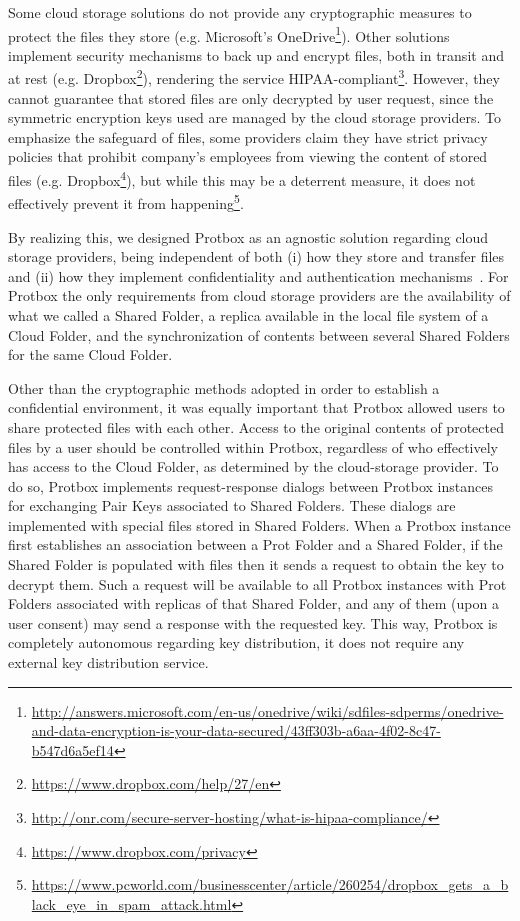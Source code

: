 \documentclass[english]{lni}
\newcommand\protbox{Protbox}
\newcommand\ProtF{Prot Folder}
\newcommand\ProtFs{Prot Folders}
\newcommand\SharedF{Shared Folder}
\newcommand\SharedFs{Shared Folders}
\newcommand\CloudF{Cloud Folder}
\newcommand\PairKeys{Pair Keys}
\begin{document}
Some cloud storage solutions do not provide any cryptographic
measures to protect the files they store (e.g. Microsoft's
OneDrive\footnote{\url{http://answers.microsoft.com/en-us/onedrive/wiki/sdfiles-sdperms/onedrive-and-data-encryption-is-your-data-secured/43ff303b-a6aa-4f02-8c47-b547d6a5ef14}}).
Other solutions implement security mechanisms to back up and encrypt
files, both in transit and at rest (e.g.
Dropbox\footnote{\url{https://www.dropbox.com/help/27/en}}), rendering the
service
HIPAA-compliant\footnote{\url{http://onr.com/secure-server-hosting/what-is-hipaa-compliance/}}.
However, they cannot guarantee that stored files are only decrypted
by user request, since the symmetric encryption keys used are
managed by the cloud storage providers.  To emphasize the safeguard
of files, some providers claim they have strict privacy policies
that prohibit company's employees from viewing the content of
stored files (e.g.
Dropbox\footnote{\url{https://www.dropbox.com/privacy}}), but while this
may be a deterrent measure, it does not effectively prevent it from
happening\footnote{\url{https://www.pcworld.com/businesscenter/article/260254/dropbox_gets_a_black_eye_in_spam_attack.html}}.

By realizing this, we designed {\protbox} as an agnostic solution
regarding cloud storage providers, being independent of both
(i) how they store and transfer files and (ii) how they implement
confidentiality and authentication mechanisms~\cite{cloudsecurity}. 
For {\protbox} the
only requirements from cloud storage providers are the availability
of what we called a {\SharedF}, a replica available in the local file
system of a {\CloudF}, and the synchronization of contents between
several {\SharedFs} for the same {\CloudF}.

Other than the cryptographic methods adopted in order to establish a
confidential environment, it was equally important that {\protbox}
allowed users to share protected files with each other. Access to the
original contents of protected files by a user should be controlled
within {\protbox}, regardless of who effectively has access to the
{\CloudF}, as determined by the cloud-storage provider. To do
so, {\protbox} implements request-response dialogs between
{\protbox} instances for exchanging {\PairKeys} associated to
{\SharedFs}. These dialogs are implemented with special files
stored in {\SharedFs}. When a {\protbox} instance first establishes an
association between a {\ProtF} and a {\SharedF}, if the {\SharedF}
is populated with files then it sends a request to
obtain the key to decrypt them. Such a request will be available to all
{\protbox} instances with {\ProtFs} associated with replicas of
that {\SharedF}, and any of them (upon a user consent) may send a
response with the requested key. This way, {\protbox} is completely
autonomous regarding key distribution, it does not require any external key
distribution service.
\end{document}
